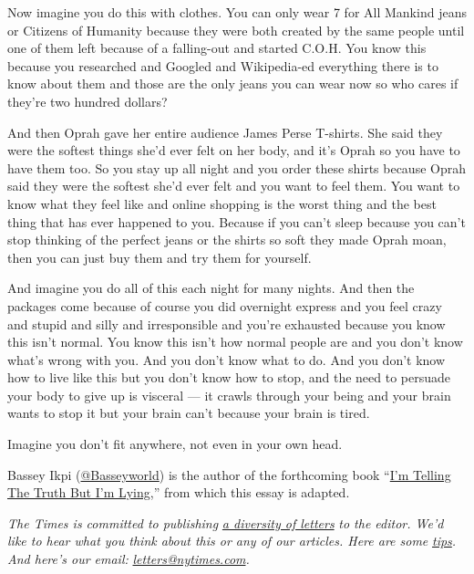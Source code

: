 Now imagine you do this with clothes. You can only wear 7 for All
Mankind jeans or Citizens of Humanity because they were both created by
the same people until one of them left because of a falling-out and
started C.O.H. You know this because you researched and Googled and
Wikipedia-ed everything there is to know about them and those are the
only jeans you can wear now so who cares if they're two hundred dollars?

And then Oprah gave her entire audience James Perse T-shirts. She said
they were the softest things she'd ever felt on her body, and it's Oprah
so you have to have them too. So you stay up all night and you order
these shirts because Oprah said they were the softest she'd ever felt
and you want to feel them. You want to know what they feel like and
online shopping is the worst thing and the best thing that has ever
happened to you. Because if you can't sleep because you can't stop
thinking of the perfect jeans or the shirts so soft they made Oprah
moan, then you can just buy them and try them for yourself.

And imagine you do all of this each night for many nights. And then the
packages come because of course you did overnight express and you feel
crazy and stupid and silly and irresponsible and you're exhausted
because you know this isn't normal. You know this isn't how normal
people are and you don't know what's wrong with you. And you don't know
what to do. And you don't know how to live like this but you don't know
how to stop, and the need to persuade your body to give up is visceral
--- it crawls through your being and your brain wants to stop it but
your brain can't because your brain is tired.

Imagine you don't fit anywhere, not even in your own head.

Bassey Ikpi (\href{https://twitter.com/Basseyworld}{@Basseyworld}) is
the author of the forthcoming book
``\href{https://www.harpercollins.com/9780062698346/im-telling-the-truth-but-im-lying/}{I'm
Telling The Truth But I'm Lying},'' from which this essay is adapted.

\emph{The Times is committed to publishing}
\href{https://www.nytimes.com/2019/01/31/opinion/letters/letters-to-editor-new-york-times-women.html}{\emph{a
diversity of letters}} \emph{to the editor. We'd like to hear what you
think about this or any of our articles. Here are some}
\href{https://help.nytimes.com/hc/en-us/articles/115014925288-How-to-submit-a-letter-to-the-editor}{\emph{tips}}\emph{.
And here's our email:}
\href{mailto:letters@nytimes.com}{\emph{letters@nytimes.com}}\emph{.}

